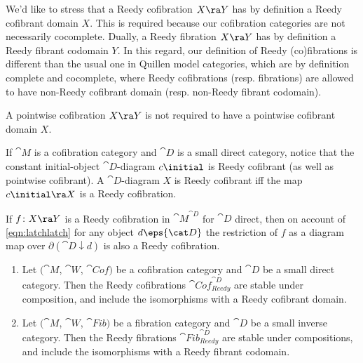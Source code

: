 We'd like to stress that a Reedy cofibration $X \ra Y$ has by definition a Reedy cofibrant domain $X$. This is required because our cofibration categories are not necessarily cocomplete. Dually, a Reedy fibration $X \ra Y$ has by definition a Reedy fibrant codomain $Y$. In this regard, our definition of Reedy (co)fibrations is different than the usual one in Quillen model categories, which are by definition complete and cocomplete, where Reedy cofibrations (resp. fibrations) are allowed to have non-Reedy cofibrant domain (resp. non-Reedy fibrant codomain).

A pointwise cofibration $X \ra Y$ is not required to have a pointwise cofibrant domain $X$.

If ${\cat M}$ is a cofibration category and ${\cat D}$ is a small direct category, notice that the constant initial-object ${\cat D}$-diagram $c\initial$ is Reedy cofibrant (as well as pointwise cofibrant). A ${\cat D}$-diagram $X$ is Reedy cofibrant iff the map $c\initial \ra X$ is a Reedy cofibration. 

If $f \colon X \ra Y$ is a Reedy cofibration in ${\cat M}^{\cat D}$ for ${\cat D}$ direct, then on account of \eqref{eqn:latchlatch} for any object $d \eps {\cat D}$ the restriction of $f$ as a diagram map over $\partial ({\cat D} \downarrow d)$ is also a Reedy cofibration. 

\begin{prop}
\label{prop::reedycofformcat}
\mbox{}
\begin{enumerate}
\item
Let $({\cat M}$, ${\cat W}$, ${\cat Cof})$ be a cofibration category and ${\cat D}$ be a small direct category. Then the Reedy cofibrations ${\cat Cof}^{\cat D}_{Reedy}$ are stable under composition, and include the isomorphisms with a Reedy cofibrant domain.
\item
Let $({\cat M}$, ${\cat W}$, ${\cat Fib})$ be a fibration category and ${\cat D}$ be a small inverse category. Then the Reedy fibrations ${\cat Fib}^{\cat D}_{Reedy}$ are stable under compositions, and include the isomorphisms with a Reedy fibrant codomain.
\end{enumerate}
\end{prop}

